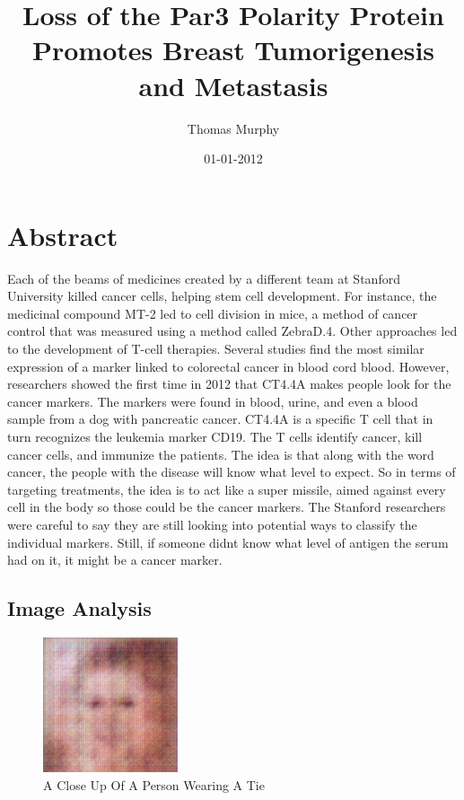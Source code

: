 \documentclass{article}%
\title{Loss of the Par3 Polarity Protein Promotes Breast Tumorigenesis and Metastasis}%
\author{Thomas Murphy}%
\affil{Second Department of Internal Medicine, Tottori University School of Medicine, Tottori 683{-}8504, Japan}%
\date{01{-}01{-}2012}%
\begin{document}
%
\normalsize%
\maketitle%
\section{Abstract}%
\label{sec:Abstract}%
Each of the beams of medicines created by a different team at Stanford University killed cancer cells, helping stem cell development.\newline%
For instance, the medicinal compound MT{-}2 led to cell division in mice, a method of cancer control that was measured using a method called ZebraD.4. Other approaches led to the development of T{-}cell therapies.\newline%
Several studies find the most similar expression of a marker linked to colorectal cancer in blood  cord blood.\newline%
However, researchers showed the first time in 2012 that CT4.4A makes people look for the cancer markers. The markers were found in blood, urine, and even a blood sample from a dog with pancreatic cancer.\newline%
CT4.4A is a specific T cell that in turn recognizes the leukemia marker CD19. The T cells identify cancer, kill cancer cells, and immunize the patients.\newline%
The idea is that along with the word cancer, the people with the disease will know what level to expect.\newline%
So in terms of targeting treatments, the idea is to act like a super missile, aimed against every cell in the body so those could be the cancer markers.\newline%
The Stanford researchers were careful to say they are still looking into potential ways to classify the individual markers.\newline%
Still, if someone didnt know what level of antigen the serum had on it, it might be a cancer marker.

%
\subsection{Image Analysis}%
\label{subsec:ImageAnalysis}%


\begin{figure}[h!]%
\centering%
\includegraphics[width=150px]{500_fake_images/samples_5_273.png}%
\caption{A Close Up Of A Person Wearing A Tie}%
\end{figure}

%
\end{document}
